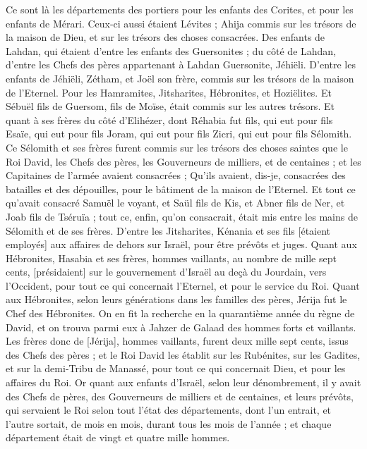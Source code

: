 \begin{multicols}{2}
Ce sont là les départements des portiers pour les enfants des Corites, et pour les enfants de Mérari.
Ceux-ci aussi étaient Lévites ; Ahija commis sur les trésors de la maison de Dieu, et sur les trésors des choses consacrées.
Des enfants de Lahdan, qui étaient d'entre les enfants des Guersonites ; du côté de Lahdan, d'entre les Chefs des pères appartenant à Lahdan Guersonite, Jéhiëli.
D'entre les enfants de Jéhiëli, Zétham, et Joël son frère, commis sur les trésors de la maison de l'Eternel.
Pour les Hamramites, Jitsharites, Hébronites, et Hoziëlites.
Et Sébuël fils de Guersom, fils de Moïse, était commis sur les autres trésors.
Et quant à ses frères du côté d'Elihézer, dont Réhabia fut fils, qui eut pour fils Esaïe, qui eut pour fils Joram, qui eut pour fils Zicri, qui eut pour fils Sélomith.
Ce Sélomith et ses frères furent commis sur les trésors des choses saintes que le Roi David, les Chefs des pères, les Gouverneurs de milliers, et de centaines ; et les Capitaines de l'armée avaient consacrées ;
Qu'ils avaient, dis-je, consacrées des batailles et des dépouilles, pour le bâtiment de la maison de l'Eternel.
Et tout ce qu'avait consacré Samuël le voyant, et Saül fils de Kis, et Abner fils de Ner, et Joab fils de Tséruïa ; tout ce, enfin, qu'on consacrait, était mis entre les mains de Sélomith et de ses frères.
D'entre les Jitsharites, Kénania et ses fils [étaient employés] aux affaires de dehors sur Israël, pour être prévôts et juges.
Quant aux Hébronites, Hasabia et ses frères, hommes vaillants, au nombre de mille sept cents, [présidaient] sur le gouvernement d'Israël au deçà du Jourdain, vers l'Occident, pour tout ce qui concernait l'Eternel, et pour le service du Roi.
Quant aux Hébronites, selon leurs générations dans les familles des pères, Jérija fut le Chef des Hébronites. On en fit la recherche en la quarantième année du règne de David, et on trouva parmi eux à Jahzer de Galaad des hommes forts et vaillants.
Les frères donc de [Jérija], hommes vaillants, furent deux mille sept cents, issus des Chefs des pères ; et le Roi David les établit sur les Rubénites, sur les Gadites, et sur la demi-Tribu de Manassé, pour tout ce qui concernait Dieu, et pour les affaires du Roi.
\VerseOne{}Or quant aux enfants d'Israël, selon leur dénombrement, il y avait des Chefs de pères, des Gouverneurs de milliers et de centaines, et leurs prévôts, qui servaient le Roi selon tout l'état des départements, dont l'un entrait, et l'autre sortait, de mois en mois, durant tous les mois de l'année ; et chaque département était de vingt et quatre mille hommes.

\end{multicols}
